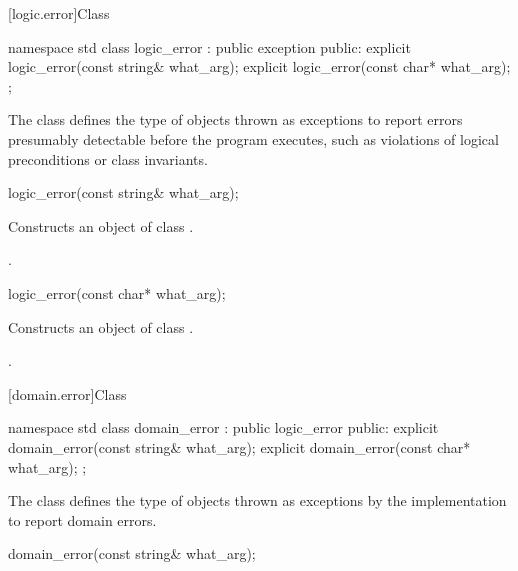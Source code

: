 [logic.error]{Class }

%
\begin{codeblock}
namespace std {
  class logic_error : public exception {
  public:
    explicit logic_error(const string& what_arg);
    explicit logic_error(const char* what_arg);
  };
}
\end{codeblock}

\pnum
The class
defines the type of objects thrown as
exceptions to report errors presumably detectable before
the program executes, such as violations of logical preconditions or class
invariants.

%
\begin{itemdecl}
logic_error(const string& what_arg);
\end{itemdecl}

\begin{itemdescr}
\pnum
\effects
Constructs an object of class
.

\pnum
\postcondition
{}.
\end{itemdescr}

%
\begin{itemdecl}
logic_error(const char* what_arg);
\end{itemdecl}

\begin{itemdescr}
\pnum
\effects
Constructs an object of class
.

\pnum
\postcondition
{}.
\end{itemdescr}

[domain.error]{Class }

%
\begin{codeblock}
namespace std {
  class domain_error : public logic_error {
  public:
    explicit domain_error(const string& what_arg);
    explicit domain_error(const char* what_arg);
  };
}
\end{codeblock}

\pnum
The class
defines the type of objects thrown as
exceptions by the implementation to report domain errors.

%
\begin{itemdecl}
domain_error(const string& what_arg);
\end{itemdecl}

